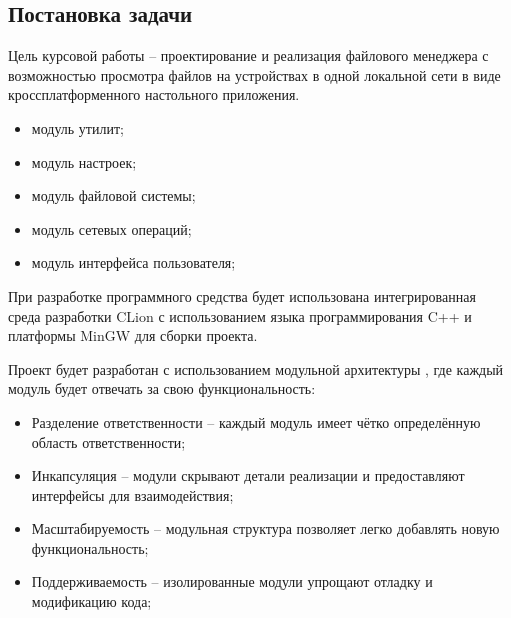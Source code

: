 \subsection{Постановка задачи}

Цель курсовой работы – проектирование и реализация файлового
менеджера с возможностью просмотра файлов на устройствах в
одной локальной сети в виде кроссплатформенного настольного
приложения.

\begin{itemize}
    \item модуль утилит;
    \item модуль настроек;
    \item модуль файловой системы;
    \item модуль сетевых операций;
    \item модуль интерфейса пользователя;
\end{itemize}

При разработке программного средства будет использована
интегрированная среда разработки CLion \cite{clionDOC}
с использованием языка программирования C++ \cite{cppDOC}
и платформы MinGW \cite{mingwDOC} для сборки проекта.

Проект будет разработан с использованием модульной архитектуры \cite{modularArch},
где каждый модуль будет отвечать за свою функциональность:

\begin{itemize}
    \item Разделение ответственности -- каждый модуль имеет чётко определённую область ответственности;
    \item Инкапсуляция -- модули скрывают детали реализации и предоставляют интерфейсы для взаимодействия;
    \item Масштабируемость -- модульная структура позволяет легко добавлять новую функциональность;
    \item Поддерживаемость -- изолированные модули упрощают отладку и модификацию кода;
\end{itemize}